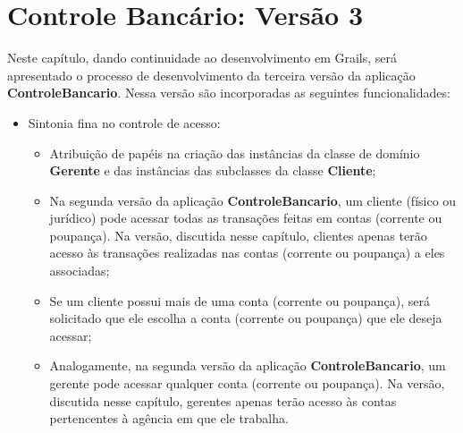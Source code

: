 \chapter{Controle Bancário: Versão 3}\label{autorizacao}

Neste  capítulo,   dando  continuidade   ao  desenvolvimento  em   Grails,  será
apresentado o processo  de desenvolvimento da terceira versão  da aplicação {\bf
  ControleBancario}. Nessa versão são incorporadas as seguintes funcionalidades:

\begin{itemize}

\vspace{0.5cm}

\item Sintonia fina no controle de acesso:

\vspace{0.5cm}

\begin{itemize}

\vspace{0.5cm}

\item Atribuição de  papéis na criação das instâncias da  classe de domínio {\bf
  Gerente} e das instâncias das subclasses da classe {\bf Cliente}; 

\vspace{0.5cm}

\item Na segunda versão da  aplicação {\bf ControleBancario}, um cliente (físico
  ou jurídico)  pode acessar todas as  transações feitas em  contas (corrente ou
  poupança).  Na versão, discutida  nesse capítulo, clientes apenas terão acesso
  às transações realizadas nas contas (corrente ou poupança) a eles associadas;

\vspace{0.5cm}

\item  Se um  cliente possui  mais  de uma  conta (corrente  ou poupança),  será
  solicitado  que ele  escolha a  conta (corrente  ou poupança)  que  ele deseja
  acessar; 

\vspace{0.5cm}

\item Analogamente,  na segunda versão  da aplicação {\bf  ControleBancario}, um
  gerente  pode  acessar qualquer  conta  (corrente  ou  poupança).  Na  versão,
  discutida nesse capítulo, gerentes  apenas terão acesso às contas pertencentes
  à agência em que ele trabalha.


\end{itemize}
\end{itemize}

